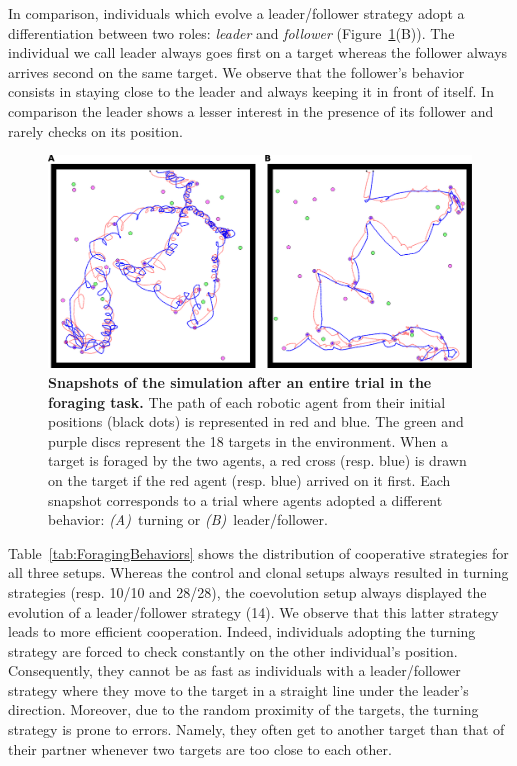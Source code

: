     In comparison, individuals which evolve a leader/follower strategy adopt a differentiation between two roles: \emph{leader} and \emph{follower} (Figure~\ref{fig:behaviorTracesHunting}(B)). The individual we call leader always goes first on a target whereas the follower always arrives second on the same target. We observe that the follower's behavior consists in staying close to the leader and always keeping it in front of itself. In comparison the leader shows a lesser interest in the presence of its follower and rarely checks on its position.

    \begin{figure}[h]
      \centerfloat
        \includegraphics[scale=0.8]{fig/ArticleRob1/figBehaviours.png}
      \caption{\textbf{Snapshots of the simulation after an entire trial in the foraging task.}
      The path of each robotic agent from their initial positions (black dots) is represented in red and blue. The green and purple discs represent the 18 targets in the environment. When a target is foraged by the two agents, a red cross (resp. blue) is drawn on the target if the red agent (resp. blue) arrived on it first. Each snapshot corresponds to a trial where agents adopted a different behavior: {\em (A)}~turning or {\em (B)}~leader/follower.}
      \label{fig:behaviorTracesHunting}
    \end{figure}


    Table~\ref{tab:ForagingBehaviors} shows the distribution of cooperative strategies for all three setups. Whereas the control and clonal setups always resulted in turning strategies (resp. 10/10 and 28/28), the coevolution setup always displayed the evolution of a leader/follower strategy (14). We observe that this latter strategy leads to more efficient cooperation. Indeed, individuals adopting the turning strategy are forced to check constantly on the other individual's position. Consequently, they cannot be as fast as individuals with a leader/follower strategy where they move to the target in a straight line under the leader's direction. Moreover, due to the random proximity of the targets, the turning strategy is prone to errors. Namely, they often get to another target than that of their partner whenever two targets are too close to each other.

